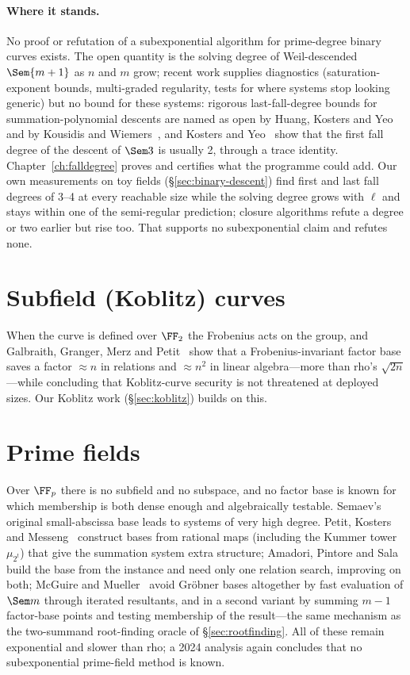 \paragraph{Where it stands.} No proof or refutation of a subexponential
algorithm for prime-degree binary curves exists. The open quantity is the
solving degree of Weil-descended $\Sem{m+1}$ as $n$ and $m$ grow; recent
work supplies diagnostics (saturation-exponent bounds, multi-graded
regularity, tests for where systems stop looking generic) but no bound for
these systems: rigorous last-fall-degree bounds for summation-polynomial
descents are named as open by Huang, Kosters and Yeo~\cite{hky2015} and by
Kousidis and Wiemers~\cite{kousidis2019}, and Kosters and
Yeo~\cite{kosters2015notes} show that the first fall degree of the descent
of $\Sem3$ is usually 2, through a trace identity. Chapter~\ref{ch:falldegree}
proves and certifies what the programme could add. Our own measurements on toy fields (\S\ref{sec:binary-descent}) find
first and last fall degrees of 3--4 at every reachable size while the
solving degree grows with $\ell$ and stays within one of the semi-regular
prediction; closure algorithms refute a degree or two earlier but rise too.
That supports no subexponential claim and refutes none.

\section{Subfield (Koblitz) curves}

When the curve is defined over $\FF_2$ the Frobenius acts on the group,
and Galbraith, Granger, Merz and Petit~\cite{ggmp2020} show that a
Frobenius-invariant factor base saves a factor $\approx n$ in relations and
$\approx n^2$ in linear algebra---more than rho's $\sqrt{2n}$---while
concluding that Koblitz-curve security is not threatened at deployed sizes.
Our Koblitz work (\S\ref{sec:koblitz}) builds on this.

\section{Prime fields}

Over $\FF_p$ there is no subfield and no subspace, and no factor base is
known for which membership is both dense enough and algebraically testable.
Semaev's original small-abscissa base leads to systems of very high degree.
Petit, Kosters and Messeng~\cite{pkm2016} construct bases from rational maps
(including the Kummer tower $\mu_{2^t}$) that give the summation system
extra structure; Amadori, Pintore and Sala~\cite{aps2018} build the base
from the instance and need only one relation search, improving on both;
McGuire and Mueller~\cite{mcguire2017} avoid Gr\"obner bases altogether by
fast evaluation of $\Sem m$ through iterated resultants, and in a second
variant by summing $m-1$ factor-base points and testing membership of the
result---the same mechanism as the two-summand root-finding oracle of
\S\ref{sec:rootfinding}. All of these remain exponential and slower than
rho; a 2024 analysis again concludes that no subexponential prime-field
method is known.


